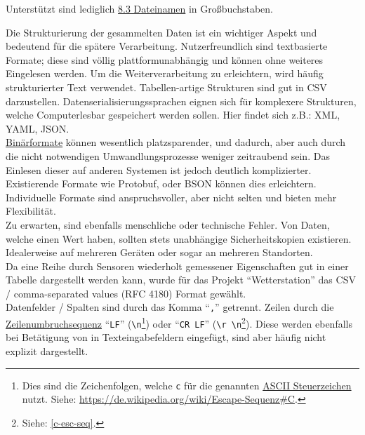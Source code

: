 \documentclass[ngerman]{handout}
\begin{document}
\begin{multicols*}{2}
    Unterstützt sind lediglich \href{https://de.wikipedia.org/wiki/8.3}{8.3 Dateinamen} in Großbuchstaben\cite{sd-lib}.\\


    Die Strukturierung der gesammelten Daten ist ein wichtiger Aspekt und bedeutend für die spätere Verarbeitung.
    Nutzerfreundlich sind textbasierte Formate; diese sind völlig plattformunabhängig und können ohne weiteres Eingelesen werden.
    Um die Weiterverarbeitung zu erleichtern, wird häufig strukturierter Text verwendet.
    Tabellen-artige Strukturen sind gut in CSV darzustellen.
    Datenserialisierungssprachen eignen sich für komplexere Strukturen, welche Computerlesbar gespeichert werden
    sollen. Hier findet sich z.B.: XML, YAML, JSON.\\

    \href{https://de.wikipedia.org/wiki/Bin\%C3\%A4rdatei}{Binärformate} können wesentlich platzsparender,
    und dadurch, aber auch durch die nicht notwendigen Umwandlungsprozesse weniger zeitraubend sein.
    Das Einlesen dieser auf anderen Systemen ist jedoch deutlich komplizierter.
    Existierende Formate wie Protobuf, oder BSON können dies erleichtern.
    Individuelle Formate sind anspruchsvoller, aber nicht selten und bieten mehr Flexibilität.\\

    Zu erwarten, sind ebenfalls menschliche oder technische Fehler.
    Von Daten, welche einen Wert haben, sollten stets unabhängige Sicherheitskopien existieren.
    Idealerweise auf mehreren Geräten oder sogar an mehreren Standorten\cite{chervenak-backup}.\\

    Da eine Reihe durch Sensoren wiederholt gemessener Eigenschaften gut in einer Tabelle dargestellt werden kann, wurde für das Projekt \enquote{Wetterstation} das CSV / comma-separated values (RFC 4180) Format gewählt\cite{rfc4180}.\\

    Datenfelder / Spalten sind durch das Komma \enquote{\texttt{,}} getrennt.
    Zeilen durch die \href{https://de.wikipedia.org/wiki/Zeilenumbruch}{Zeilenumbruchsequenz}
    \enquote{\texttt{LF}} (\texttt{\textbackslash n}\footnote{\label{c-esc-seq}Dies sind die Zeichenfolgen, welche \texttt{c} für die genannten \href{https://de.wikipedia.org/wiki/Steuerzeichen}{ASCII Steuerzeichen} nutzt. Siehe: \href{https://de.wikipedia.org/wiki/Escape-Sequenz\#C}{https://de.wikipedia.org/wiki/Escape-Sequenz\#C}.})
    oder \enquote{\texttt{CR LF}} (\texttt{\textbackslash r \textbackslash n}\footnote{Siehe: \autoref{c-esc-seq}.}).
    Diese werden ebenfalls bei Betätigung von \keys{\return} in Texteingabefeldern eingefügt, sind aber häufig nicht explizit dargestellt.


\end{multicols*}
\end{document}
